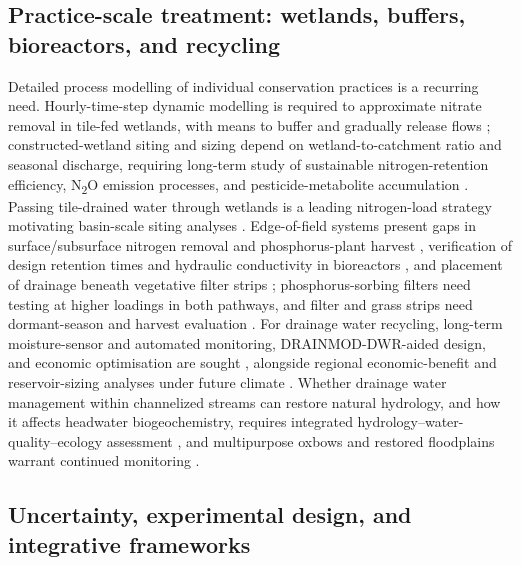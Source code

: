 \documentclass[11pt]{article}
\begin{document}
\subsection{Practice-scale treatment: wetlands, buffers, bioreactors, and recycling}

Detailed process modelling of individual conservation practices is a recurring
need. Hourly-time-step dynamic modelling is required to approximate nitrate removal
in tile-fed wetlands, with means to buffer and gradually release flows
\parencite{Tanner2011}; constructed-wetland siting and sizing depend on
wetland-to-catchment ratio and seasonal discharge, requiring long-term study of
sustainable nitrogen-retention efficiency, N\textsubscript{2}O emission processes,
and pesticide-metabolite accumulation
\parencite{Steidl2019,Tournebize2017,Kovacic2006,Haverstock2017}. Passing
tile-drained water through wetlands is a leading nitrogen-load strategy motivating
basin-scale siting analyses \parencite{Baeumler2020,Billy2013,Madramootoo2007,Kadlec2012}.
Edge-of-field systems present gaps in surface/subsurface nitrogen removal and
phosphorus-plant harvest \parencite{Gordon2021}, verification of design retention
times and hydraulic conductivity in bioreactors \parencite{Feyereisen2015}, and
placement of drainage beneath vegetative filter strips \parencite{Bhattarai2009};
phosphorus-sorbing filters need testing at higher loadings in both pathways, and
filter and grass strips need dormant-season and harvest evaluation
\parencite{Plach2023,Holly2016,Vallée2015}. For drainage water recycling,
long-term moisture-sensor and automated monitoring, DRAINMOD-DWR-aided design,
and economic optimisation are sought \parencite{Kaur2021,Moursi2024,Hay2021,Willison2021},
alongside regional economic-benefit and reservoir-sizing analyses under future
climate \parencite{Kosari2024,Li2021b}. Whether drainage water management within
channelized streams can restore natural hydrology, and how it affects headwater
biogeochemistry, requires integrated hydrology--water-quality--ecology assessment
\parencite{King2009,Sunohara2015,Dalzell2018}, and multipurpose oxbows and
restored floodplains warrant continued monitoring
\parencite{Leberg2024,Schilling2017,ElAgha2020,AbdelDayem2007}.

\subsection{Uncertainty, experimental design, and integrative frameworks}
\end{document}

